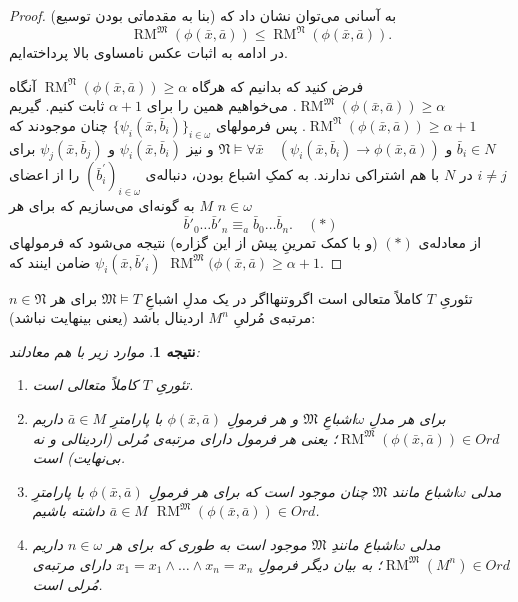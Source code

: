 \documentclass[12pt,a4paper]{report}
\theoremstyle{colorhead}
\newtheorem{cor}[thm]{نتیجه}
\DeclareMathOperator{\RM}{RM}
\begin{document}
\begin{proof}
به آسانی می‌توان نشان داد که (بنا به مقدماتی بودن توسیع)
\[
\RM^\mathfrak{M}(\phi(\bar{x},\bar{a}))\leq \RM^\mathfrak{N}(\phi(\bar{x},\bar{a})).
\]
در ادامه به اثبات عکس نامساوی بالا پرداخته‌ایم. 
\par 
فرض کنید که بدانیم که هرگاه
$\RM^\mathfrak{N}(\phi(\bar{x},\bar{a}))\geq \alpha$
آنگاه 
$\RM^\mathfrak{M}(\phi(\bar{x},\bar{a}))\geq \alpha$.
می‌خواهیم همین را برای
$\alpha+1$
ثابت کنیم.  گیریم
$\RM^\mathfrak{N}(\phi(\bar{x},\bar{a}))\geq \alpha+1$.
پس فرمولهای
$\{\psi_i(\bar{x},\bar{b}_i)\}_{i\in \omega}$
چنان موجودند که 
$\bar{b}_i\in N$
و
$\mathfrak{N}\models \forall \bar{x} \quad (\psi_i(\bar{x},\bar{b}_i)\to \phi(\bar{x},\bar{a}))$
و نیز
$\psi_i(\bar{x},\bar{b}_i)$
و
$\psi_j(\bar{x},\bar{b}_j)$
برای 
$i\not=j$
در
$N$
با هم اشتراکی ندارند.   
به کمکِ اشباع بودن،
دنباله‌ی
$(\bar{b}^\prime _i)_{i\in \omega}$
را از اعضای
$M$
به گونه‌ای می‌سازیم که برای هر
$n\in \omega$
\[
\bar{b}'_0\ldots\bar{b}'_n\equiv_a \bar{b}_0\ldots\bar{b}_n. \quad(*)
\]
از معادله‌ی
$(*)$
(و با کمک تمرینِ پیش از این گزاره)
نتیجه می‌شود که
فرمولهای
$\psi_i(\bar{x},\bar{b}'_i)$
ضامن اینند که
$\RM^\mathfrak{M}(\phi(\bar{x},\bar{a})\geq \alpha+1$.
\end{proof}
تئوریِ 
$T$
کاملاً متعالی است اگروتنهااگر در یک مدلِ اشباعِ
$\mathfrak{M}\models T$
برای
هر
$n\in \mathfrak{N}$
مرتبه‌ی مُرلیِ
$M^n$
اردینال باشد (یعنی بینهایت نباشد):
\begin{cor}
	موارد زیر با هم معادلند:
	\begin{enumerate}
		\item 
		تئوریِ
		$T$
		کاملاً متعالی است.
		\item 
		برای هر مدلِ
		$\omega$اشباعِ
		$\mathfrak{M}$
		و هر فرمولِ
		$\phi(\bar{x},\bar{a})$
		با پارامترِ
		$\bar{a}\in M$
		داریم
		\mbox{$\RM^\mathfrak{M}(\phi(\bar{x},\bar{a}))\in Ord$}؛
		یعنی هر فرمول دارای مرتبه‌ی مُرلی (اردینالی و نه بی‌نهایت) است. 
		\item 
		مدلی
		$\omega$اشباع
		 مانند
		$\mathfrak{M}$
		 چنان موجود است که 
برای
		 هر فرمولِ
		 $\phi(\bar{x},\bar{a})$
		 با پارامترِ
		 $\bar{a}\in M$
داشته باشیم
		 $\RM^\mathfrak{M}(\phi(\bar{x},\bar{a}))\in Ord$.
		 \item 
		 مدلی 
		 $\omega
		 $اشباع 
		 مانندِ
		 $\mathfrak{M}$
		 موجود است به طوری که برای هر
		 $n\in \omega$
		 داریم
		 \mbox{$\RM^\mathfrak{M}(M^n)\in Ord$؛}
		 به بیان دیگر 
		 فرمولِ
		 $x_1=x_1\wedge\ldots\wedge x_n=x_n$
		 دارای مرتبه‌ی مُرلی است. 
	\end{enumerate}
	\end{cor}
\end{document}
